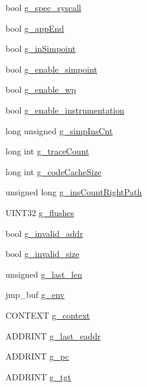\begin{DoxyCompactItemize}
\item 
bool \hyperlink{structg__variable_a2527496ce273ca32855343e8401fb4f8}{g\_\-spec\_\-syscall}
\item 
bool \hyperlink{structg__variable_ac0ace8e752b855d8a33cd9c9a5d62511}{g\_\-appEnd}
\item 
bool \hyperlink{structg__variable_a1bfe24cfc139671202d50d3617bc3095}{g\_\-inSimpoint}
\item 
bool \hyperlink{structg__variable_a1e6b96906fa24ada5ee9e969e65adb86}{g\_\-enable\_\-simpoint}
\item 
bool \hyperlink{structg__variable_a77b6c2a82a2eb4c8216123f75080ec16}{g\_\-enable\_\-wp}
\item 
bool \hyperlink{structg__variable_a24cc6242b0cf003080328df4b4e3ddca}{g\_\-enable\_\-instrumentation}
\item 
long unsigned \hyperlink{structg__variable_a9bef325956a77c8dc2080d7f6ea1a7a9}{g\_\-simpInsCnt}
\item 
long int \hyperlink{structg__variable_ad00b3634585f9cc7e89adb907114a290}{g\_\-traceCount}
\item 
long int \hyperlink{structg__variable_aa65753112ddcc38c6ecea36b807a9a38}{g\_\-codeCacheSize}
\item 
unsigned long \hyperlink{structg__variable_a9849ae320434c4f9d060f131e24509fd}{g\_\-insCountRightPath}
\item 
UINT32 \hyperlink{structg__variable_aee7d9a2652e4ea63755601664d7f2a00}{g\_\-flushes}
\item 
bool \hyperlink{structg__variable_a259dcd1135795c605246fdbae100601f}{g\_\-invalid\_\-addr}
\item 
bool \hyperlink{structg__variable_a5256c1a4113a6054f2a8e07a108faaf5}{g\_\-invalid\_\-size}
\item 
unsigned \hyperlink{structg__variable_a310b38dcf23edbd0a80618cbb9fc9e55}{g\_\-last\_\-len}
\item 
jmp\_\-buf \hyperlink{structg__variable_ae22303265d64707d4e5c29a9fc9bae70}{g\_\-env}
\item 
CONTEXT \hyperlink{structg__variable_a5b23f6047c40d03de740f5d82416307d}{g\_\-context}
\item 
ADDRINT \hyperlink{structg__variable_a35c782efa4c2f2d4dc350ec814e77018}{g\_\-last\_\-eaddr}
\item 
ADDRINT \hyperlink{structg__variable_abb0cb377249c922c2132cd5bbabb0509}{g\_\-pc}
\item 
ADDRINT \hyperlink{structg__variable_a34e0ec891cac1d35b52ed384463a0cf9}{g\_\-tgt}
\item 

\end{DoxyCompactItemize}

